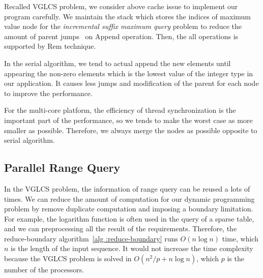 Recalled VGLCS problem, we consider above cache issue to implement our
program carefully.  We maintain the stack which stores the indices of
maximum value node for the {\em incremental suffix maximum query}
problem to reduce the amount of parent jumps~\cite{Peng2011TheLC} on {\sc
Append} operation.  Then, the all operations is supported by {\sc Rem}
technique.

In the serial algorithm, we tend to actual append the new elements until
appearing the non-zero elements which is the lowest value of the integer
type in our application.  It causes less jumps and modification of the
parent for each node to improve the performance.




For the multi-core platform, the efficiency of thread synchronization is
the important part of the performance, so we tends to make the worst
case as more smaller as possible.  Therefore, we always merge the nodes
as possible opposite to serial algorithm.



\iffalse
在單一處理器下，由於動態規劃常會遇到不合定義而填入連續的 0，
多次的插入操作可以直到下一個非零的時候再進行，同時也改善查表的花費，
直到下一個非零的才進行的操作，增加嚴重增加某一次操作的時間。

在多核心平台下，要避免單一操作時間過長，一旦單一操作時間過長，
多個工作的同步將變得非常沒有效率。因此，每一次操作都強制合併，這有別於循序算法的版本。
\fi

\subsection{Parallel Range Query}


In the VGLCS problem, the information of range query can be reused a
lots of times.  We can reduce the amount of computation for our dynamic
programming problem by remove duplicate computation and imposing a
boundary limitation.  For example, the logarithm function is often used
in the query of a sparse table, and we can preprocessing all the result
of the requirements.  Therefore, the reduce-boundary algorithm~\ref{alg
:reduce-boundary} runs $O(n \log n)$ time, which $n$  is the length of
the input sequence.  It would not increase the time complexity because
the VGLCS problem is solved in  $O(n^2 / p + n \log n)$, which $p$ is
the number of the processors.


